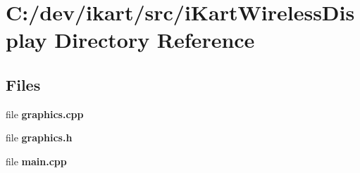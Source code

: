 \section{C\+:/dev/ikart/src/i\+Kart\+Wireless\+Display Directory Reference}
\label{dir_4d5aca832f9c0672e285fce6aa9a27ae}
\subsection*{Files}
\begin{DoxyCompactItemize}
\item 
file {\bfseries graphics.\+cpp}
\item 
file {\bfseries graphics.\+h}
\item 
file {\bfseries main.\+cpp}
\end{DoxyCompactItemize}
